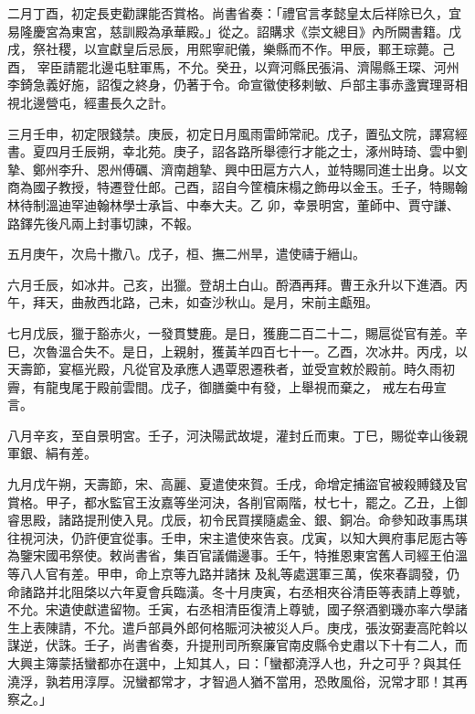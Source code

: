 \begin{pinyinscope}
 二月丁酉，初定長吏勸課能否賞格。尚書省奏：「禮官言孝懿皇太后祥除已久，宜易隆慶宮為東宮，慈訓殿為承華殿。」從之。詔購求《崇文總目》內所闕書籍。戊戌，祭社稷，以宣獻皇后忌辰，用熙寧祀儀，樂縣而不作。甲辰，鄆王琮薨。己酉，
 宰臣請罷北邊屯駐軍馬，不允。癸丑，以齊河縣民張涓、濟陽縣王琛、河州李錡急義好施，詔復之終身，仍著于令。命宣徽使移剌敏、戶部主事赤盞實理哥相視北邊營屯，經畫長久之計。



 三月壬申，初定限錢禁。庚辰，初定日月風雨雷師常祀。戊子，置弘文院，譯寫經書。夏四月壬辰朔，幸北苑。庚子，詔各路所舉德行才能之士，涿州時琦、雲中劉摯、鄭州李升、恩州傅礪、濟南趙摯、興中田扈方六人，並特賜同進士出身。以文商為國子教授，特遷登仕郎。己酉，詔自今筐櫝床榻之飾毋以金玉。壬子，特賜翰林待制溫迪罕迪翰林學士承旨、中奉大夫。乙
 卯，幸景明宮，董師中、賈守謙、路鐸先後凡兩上封事切諫，不報。



 五月庚午，次烏十撒八。戊子，桓、撫二州旱，遣使禱于縉山。



 六月壬辰，如冰井。己亥，出獵。登胡土白山。酹酒再拜。曹王永升以下進酒。丙午，拜天，曲赦西北路，己未，如查沙秋山。是月，宋前主甗殂。



 七月戊辰，獵于豁赤火，一發貫雙鹿。是日，獲鹿二百二十二，賜扈從官有差。辛巳，次魯溫合失不。是日，上親射，獲黃羊四百七十一。乙酉，次冰井。丙戌，以天壽節，宴樞光殿，凡從官及承應人遇覃恩遷秩者，並受宣敕於殿前。時久雨初霽，有龍曳尾于殿前雲間。戊子，御膳羹中有發，上舉視而棄之，
 戒左右毋宣言。



 八月辛亥，至自景明宮。壬子，河決陽武故堤，灌封丘而東。丁巳，賜從幸山後親軍銀、絹有差。



 九月戊午朔，天壽節，宋、高麗、夏遣使來賀。壬戌，命增定捕盜官被殺賻錢及官賞格。甲子，都水監官王汝嘉等坐河決，各削官兩階，杖七十，罷之。乙丑，上御睿思殿，諸路提刑使入見。戊辰，初令民買撲隨處金、銀、銅冶。命參知政事馬琪往視河決，仍許便宜從事。壬申，宋主遣使來告哀。戊寅，以知大興府事尼厖古等為鑒宋國弔祭使。敕尚書省，集百官議備邊事。壬午，特推恩東宮舊人司經王伯溫等八人官有差。甲申，命上京等九路并諸抹
 及糺等處選軍三萬，俟來春調發，仍命諸路并北阻棨以六年夏會兵臨潢。冬十月庚寅，右丞相夾谷清臣等表請上尊號，不允。宋遺使獻遣留物。壬寅，右丞相清臣復清上尊號，國子祭酒劉璣亦率六學諸生上表陳請，不允。遣戶部員外郎何格賑河決被災人戶。庚戌，張汝弼妻高陀斡以謀逆，伏誅。壬子，尚書省奏，升提刑司所察廉官南皮縣令史肅以下十有二人，而大興主簿蒙括蠻都亦在選中，上知其人，曰：「蠻都澆浮人也，升之可乎？與其任澆浮，孰若用淳厚。況蠻都常才，才智過人猶不當用，恐敗風俗，況常才耶！其再察之。」




\end{pinyinscope}
